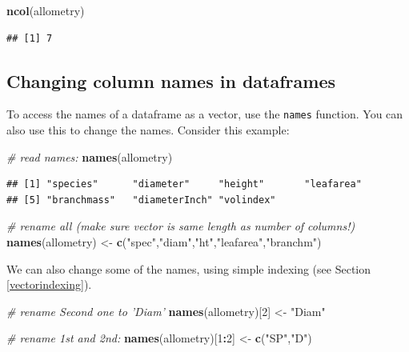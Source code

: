 \documentclass[]{book}
\newenvironment{Shaded}{\begin{snugshade}}{\end{snugshade}}
\newcommand{\CommentTok}[1]{\textcolor[rgb]{0.56,0.35,0.01}{\textit{#1}}}
\newcommand{\DecValTok}[1]{\textcolor[rgb]{0.00,0.00,0.81}{#1}}
\newcommand{\KeywordTok}[1]{\textcolor[rgb]{0.13,0.29,0.53}{\textbf{#1}}}
\newcommand{\NormalTok}[1]{#1}
\newcommand{\OperatorTok}[1]{\textcolor[rgb]{0.81,0.36,0.00}{\textbf{#1}}}
\newcommand{\StringTok}[1]{\textcolor[rgb]{0.31,0.60,0.02}{#1}}
\begin{document}
\begin{Shaded}
\begin{Highlighting}[]
\KeywordTok{ncol}\NormalTok{(allometry)}
\end{Highlighting}
\end{Shaded}

\begin{verbatim}
## [1] 7
\end{verbatim}

\hypertarget{namesdataframe}{%
\subsection{Changing column names in dataframes}\label{namesdataframe}}

To access the names of a dataframe as a vector, use the \texttt{names} function. You can also use this to change the names. Consider this example:

\begin{Shaded}
\begin{Highlighting}[]
\CommentTok{# read names:}
\KeywordTok{names}\NormalTok{(allometry)}
\end{Highlighting}
\end{Shaded}

\begin{verbatim}
## [1] "species"      "diameter"     "height"       "leafarea"    
## [5] "branchmass"   "diameterInch" "volindex"
\end{verbatim}

\begin{Shaded}
\begin{Highlighting}[]
\CommentTok{# rename all (make sure vector is same length as number of columns!)}
\KeywordTok{names}\NormalTok{(allometry) <-}\StringTok{ }\KeywordTok{c}\NormalTok{(}\StringTok{"spec"}\NormalTok{,}\StringTok{"diam"}\NormalTok{,}\StringTok{"ht"}\NormalTok{,}\StringTok{"leafarea"}\NormalTok{,}\StringTok{"branchm"}\NormalTok{)}
\end{Highlighting}
\end{Shaded}

We can also change some of the names, using simple indexing (see Section \ref{vectorindexing}).

\begin{Shaded}
\begin{Highlighting}[]
\CommentTok{# rename Second one to 'Diam'}
\KeywordTok{names}\NormalTok{(allometry)[}\DecValTok{2}\NormalTok{] <-}\StringTok{ "Diam"}

\CommentTok{# rename 1st and 2nd:}
\KeywordTok{names}\NormalTok{(allometry)[}\DecValTok{1}\OperatorTok{:}\DecValTok{2}\NormalTok{] <-}\StringTok{ }\KeywordTok{c}\NormalTok{(}\StringTok{"SP"}\NormalTok{,}\StringTok{"D"}\NormalTok{)}
\end{Highlighting}
\end{Shaded}
\end{document}
